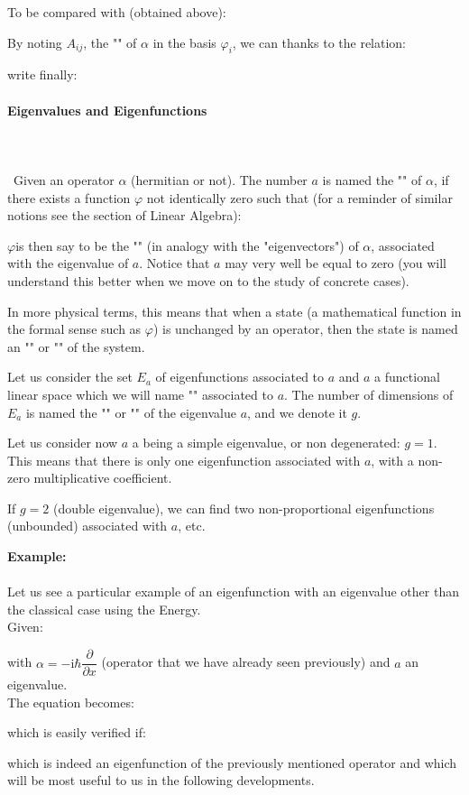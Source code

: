 	To be compared with (obtained above):
	
	By noting $A_{ij}$, the "" of $\alpha$ in the basis $\varphi_i$, we can thanks to the relation:
	
	write finally:
	
	
	\paragraph{Eigenvalues and Eigenfunctions}\mbox{}\\\\\
	Given an operator $\alpha$ (hermitian or not). The number $a$ is named the "" of $\alpha$, if there exists a function $\varphi$ not identically zero such that (for a reminder of similar notions see the section of Linear Algebra):

$\varphi $is then say to be the "" (in analogy with the "eigenvectors") of $\alpha$, associated with the eigenvalue of $a$. Notice that $a$ may very well be equal to zero (you will understand this better when we move on to the study of concrete cases).
	
	In more physical terms, this means that when a state (a mathematical function in the formal sense such as $\varphi$) is unchanged by an operator, then the state is named an "" or "" of the system.

	Let us consider the set $E_a$ of eigenfunctions associated to $a$ and $a$ a functional linear space which we will name "" associated to $a$. The number of dimensions of $E_a$ is named the "" or "" of the eigenvalue $a$, and we denote it $g$.

	Let us consider now $a$ a being a simple eigenvalue, or non degenerated: $g=1$. This means that there is only one eigenfunction associated with $a$, with a non-zero multiplicative coefficient.

	If $g=2$ (double eigenvalue), we can find two non-proportional eigenfunctions (unbounded) associated with $a$, etc.
	
	\begin{tcolorbox}[colframe=black,colback=white,sharp corners]
	\textbf{{\Large {}}Example:}\\\\
	Let us see a particular example of an eigenfunction with an eigenvalue other than the classical case using the Energy.\\
	
	Given:
	
	with $\alpha=-\mathrm{i}\hbar\dfrac{\partial}{\partial x}$ (operator that we have already seen previously) and $a$ an eigenvalue.\\

	The equation becomes:
	
	which is easily verified if:
	
	which is indeed an eigenfunction of the previously mentioned operator and which will be most useful to us in the following developments.
	\end{tcolorbox}
	
